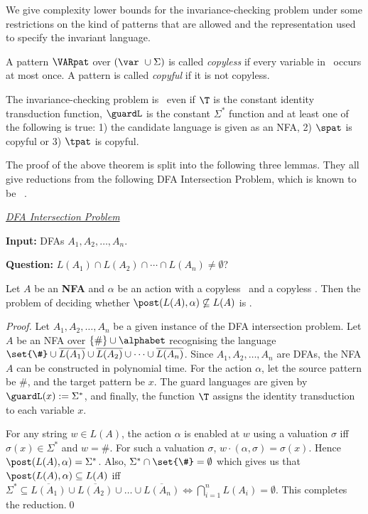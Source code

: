 We give complexity lower bounds for the invariance-checking problem under some restrictions on the kind of patterns that are allowed and the
representation used to specify the invariant language.
\begin{definition}
	A pattern $\VARpat$ over $(\var ~ \cup \Sigma)$ is called \emph{copyless} if every variable in \VARpat\ occurs at most once. A pattern
	is called \emph{copyful} if it is not copyless.
\end{definition}

\begin{theorem}
	The invariance-checking problem is \psph\ even if $\T$ is the constant identity transduction function, $\guardL$ is the constant
	$\Sigma^*$ function and at least one of the following is true: 1) the candidate language is given as an NFA, 2) $\spat$ is copyful
	or 3) $\tpat$ is copyful.
\end{theorem}

The proof of the above theorem is split into the following three lemmas. 
They all give reductions from the following DFA Intersection Problem, which is known to be \pspc\ \cite{K1977}.
\medskip

\uline{\emph{DFA Intersection Problem}}

\textbf{Input:} DFAs $A_1,A_2, \ldots, A_n$.

\textbf{Question:} $L(A_1) \cap L(A_2) \cap \cdots \cap L(A_n) \neq \emptyset$?

%
\begin{lemma}
	Let $A$ be an \textbf{NFA}  and  $\alpha$ be an action 
	 with a copyless \spat\ and a copyless \tpat. Then the 
	problem of deciding whether $\post(L(A), \alpha) \not\subseteq L(A)$ 
	is \psph. 
\end{lemma}
%
\begin{proof}
	Let $A_1, A_2, \dots, A_n$ be a given instance of the DFA intersection problem. Let $A$ be an NFA over $\{\#\} \cup \alphabet$ recognising
	the language $\set{\#} \cup \overline{L(A_1)} \cup \overline{L(A_2)} \cup \cdots \cup \overline{L(A_n)}$. Since $A_1, A_2, \dots, A_n$ are
	DFAs, the NFA $A$ can be constructed in polynomial time. For the action $\alpha$, let the source pattern be \#, and the target pattern be
	$x$. The guard languages are given by $\guardL(x) := \Sigma^*$, and finally, the function $\T$ assigns the identity transduction to each
	variable $x$.

	For any string  $w \in L(A)$, the action $\alpha$ is enabled at $w$ using a valuation $\sigma$ iff $\sigma(x)\in \Sigma^*$ and $w = \#$.
	For such a valuation $\sigma$, $w \cdot(\alpha,\sigma)=\sigma(x)$. Hence $\post(L(A), \alpha) = \Sigma^*$. Also,
	$\Sigma^* \cap \set{\#} = \emptyset$ which gives us that $\post(L(A), \alpha) \subseteq L(A)$ iff
	$\Sigma^* \subseteq \overline{L(A_1)} \cup \overline{L(A_2)} \cup \dots \cup \overline{L(A_n)} \iff \bigcap_{i=1}^n L(A_i) = \emptyset$.
	This completes the reduction.\qed
\end{proof}

